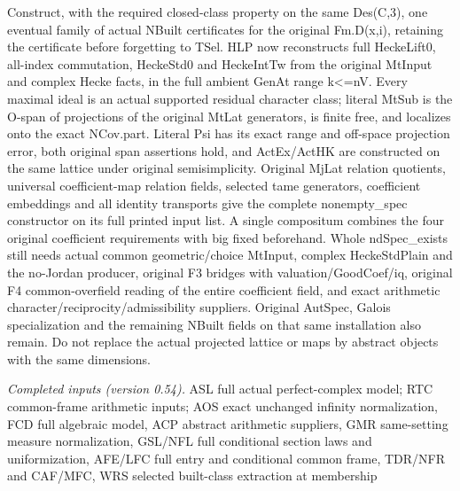 \documentclass[11pt,a4paper]{article}
\numberwithin{equation}{section}
\theoremstyle{remark}\newtheorem{remark}[theorem]{Remark}
\begin{document}
Construct, with the required closed-class property on the same Des(C,3), one eventual family of actual NBuilt certificates for the original Fm.D(x,i), retaining the certificate before forgetting to TSel. HLP now reconstructs full HeckeLift0, all-index commutation, HeckeStd0 and HeckeIntTw from the original MtInput and complex Hecke facts, in the full ambient GenAt range k<=nV. Every maximal ideal is an actual supported residual character class; literal MtSub is the O-span of projections of the original MtLat generators, is finite free, and localizes onto the exact NCov.part. Literal Psi has its exact range and off-space projection error, both original span assertions hold, and ActEx/ActHK are constructed on the same lattice under original semisimplicity. Original MjLat relation quotients, universal coefficient-map relation fields, selected tame generators, coefficient embeddings and all identity transports give the complete nonempty\_\allowbreak spec constructor on its full printed input list. A single compositum combines the four original coefficient requirements with big fixed beforehand. Whole ndSpec\_\allowbreak exists still needs actual common geometric/choice MtInput, complex HeckeStdPlain and the no-Jordan producer, original F3 bridges with valuation/GoodCoef/iq, original F4 common-overfield reading of the entire coefficient field, and exact arithmetic character/reciprocity/admissibility suppliers. Original AutSpec, Galois specialization and the remaining NBuilt fields on that same installation also remain. Do not replace the actual projected lattice or maps by abstract objects with the same dimensions.

\emph{Completed inputs (version 0.54).} ASL full actual perfect-complex model; RTC common-frame arithmetic inputs; AOS exact unchanged infinity normalization, FCD full algebraic model, ACP abstract arithmetic suppliers, GMR same-setting measure normalization, GSL/NFL full conditional section laws and uniformization, AFE/LFC full entry and conditional common frame, TDR/NFR and CAF/MFC, WRS selected built-class extraction at membership
\end{document}
